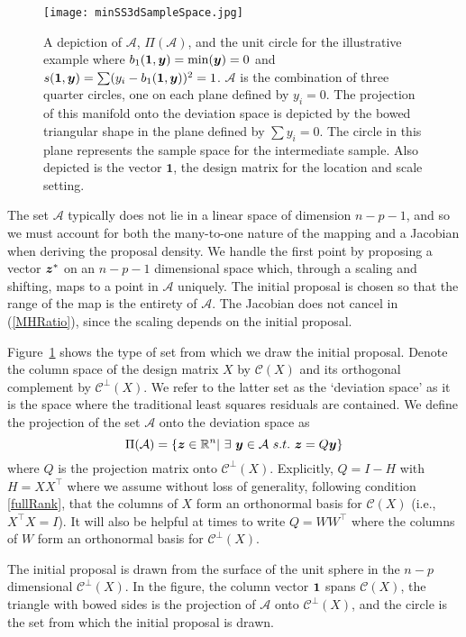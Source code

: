\documentclass[12pt]{article}
\newcommand{\by}{\mbox{\boldmath $y$}}
\newcommand{\bz}{\mbox{\boldmath $z$}}
\newcommand{\mc}{\mathcal}
\begin{document}
\begin{figure}
\centering
\texttt{[image: minSS3dSampleSpace.jpg]}
\caption{A depiction of $\mathcal{A}$, $\Pi(\mathcal{A})$, and the
  unit circle for the illustrative example where $b_{1}(\mathbf{1},\by)=\min(\by)=0$ and
  $s(\mathbf{1},\by)=\sum (y_i -b_{1}(\mathbf{1},\by))^2 =1$.
$\mathcal{A}$ is the combination of three quarter circles, one
  on each plane defined by $y_i=0$. The projection of this manifold
  onto the deviation space is depicted by the bowed triangular shape
  in the plane defined by $\sum y_i=0$. The circle in this plane
  represents the sample space for the intermediate sample. Also
  depicted is the vector $\mathbf{1}$, the design matrix for the
  location and scale setting.}
\label{fig:sampSpace}
\end{figure}

The set $\mathcal{A}$ typically does not lie in a linear space of dimension $n - p - 1$, and 
so we must account for both the many-to-one nature of the mapping and
a Jacobian when deriving the proposal density.  We handle the first
point by proposing a vector $\bz^*$ 
on an $n - p - 1$ dimensional space which, through a scaling and
shifting, maps to a point 
in $\mathcal{A}$ uniquely.  
The initial proposal is chosen so that the range of the map is the
entirety of $\mathcal{A}$.  The Jacobian does not cancel in
(\ref{MHRatio}), since the scaling depends on the initial proposal. 

Figure~\ref{fig:sampSpace} shows the type of set from which we draw the initial proposal.  Denote the 
column space of the design matrix $X$ by $\mathcal{C}(X)$ and its orthogonal complement by $\mc{C}^\perp(X)$. 
We refer to the latter set as the `deviation space' as it is the space where the traditional least 
squares residuals are contained.  We define the projection of the set $\mathcal{A}$ onto the deviation space as 
\begin{equation}
\label{sampleSpacePerp}
\Pi(\mathcal{A})=\{\bz\in \mathbb{R}^n |\ \exists\ \by\in \mathcal{A}\
s.t.\ \bz=Q \by \}
\end{equation} 
where $Q$ is the projection matrix onto  $\mc{C}^\perp(X)$. Explicitly, $Q=I-H$ with $H=XX^\top$ where we assume without
loss of generality, following condition \ref{fullRank},  that the
columns of $X$ form an orthonormal basis for $\mc{C}(X)$
(i.e., $X^\top X=I$). It will also be helpful at times to write $Q=WW^{\top}$ where the columns of $W$ form an orthonormal basis for $\mc{C}^\perp(X)$. 

The initial proposal is drawn from the surface of the unit sphere in the $n-p$ dimensional $\mc{C}^\perp(X)$.  
In the figure, the column vector $\bf{1}$ spans $\mc{C}(X)$, the triangle with bowed sides is the projection of 
$\mathcal{A}$ onto $\mc{C}^\perp(X)$, and the circle is the set from which the initial proposal is drawn.  
\end{document}
